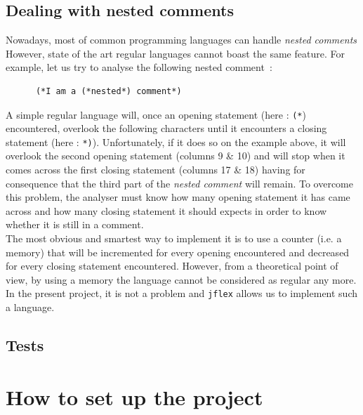 \documentclass[a4paper,11pt]{article}
\begin{document}
  \subsection{Dealing with nested comments}
    Nowadays, most of common programming languages can handle \textit{nested comments} However, state of the art regular languages cannot boast the same feature. For example, let us try to analyse the following nested comment~:
    \begin{lstlisting}
      (*I am a (*nested*) comment*)
    \end{lstlisting}
    A simple regular language will, once an opening statement (here : \verb|(*|) encountered, overlook the following characters until it encounters a closing statement (here : \verb|*)|). Unfortunately, if it does so on the example above, it will overlook the second opening statement (columns 9 \& 10) and will stop when it comes across the first closing statement (columns 17 \& 18) having for consequence that the third part of the \textit{nested comment} will remain. To overcome this problem, the analyser must know how many opening statement it has came across and how many closing statement it should expects in order to know whether it is still in a comment.\\
    The most obvious and smartest way to implement it is to use a counter (i.e. a memory) that will be incremented for every opening encountered and decreased for every closing statement encountered. However, from a theoretical point of view, by using a memory the language cannot be considered as regular any more. In the present project, it is not a problem and \verb|jflex| allows us to implement such a language.
    
  \subsection{Tests}
    
    
    

\section{How to set up the project}
\end{document}
